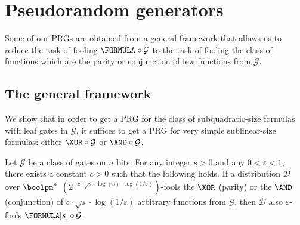 	\section{Pseudorandom generators}\label{sec:prgs}
	
	Some of our PRGs are obtained from a general framework that allows us to reduce the task of fooling $\FORMULA\circ\mathcal{G}$ to the task of fooling the class of functions which are the parity or conjunction of few functions from $\mathcal{G}$.
	
	\subsection{The general framework}
	
	We show that in order to get a PRG for the class of subquadratic-size formulas with leaf gates in $\mathcal{G}$, it suffices to get a PRG for very simple sublinear-size formulas: either $\XOR\circ\mathcal{G}$ or $\AND\circ\mathcal{G}$.  
	
	\begin{theorem}\label{thm:prg-main}
		Let $\mathcal{G}$ be a class of gates on $n$ bits. For any integer $s>0$ and any $0<\varepsilon<1$, there exists a constant $c>0$ such that the following holds. If a distribution $\mathcal{D}$ over $\boolpm^n$ $\left(2^{-c\cdot\sqrt{s}\cdot\log (s)\cdot \log(1/\varepsilon)}\right)$-fools the $\XOR$ (parity) or the $\AND$ (conjunction) of $c\cdot\sqrt{s}\cdot \log(1/\varepsilon)$ arbitrary functions from $\mathcal{G}$, then $\mathcal{D}$ also $\varepsilon$-fools $\FORMULA[s]\circ\mathcal{G}$.
	\end{theorem}
	
